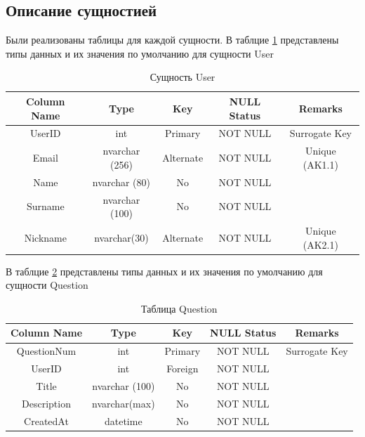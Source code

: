 \documentclass[a4paper, 14pt]{extarticle}
\begin{document}
\subsection{Описание сущностией}

Были реализованы таблицы для каждой сущности. В таблцие \ref{tab:user_tab} представлены типы данных и их значения по умолчанию для сущности User

\begin{table}[H]
\centering
\caption{Сущность User}
\label{tab:user_tab}
\setlength\extrarowheight{2pt}
\begin{tabular}{|c|c|c|c|c|}
\hline
\textbf{Column Name} & \textbf{Type} & \textbf{Key} & \textbf{NULL Status} & \textbf{Remarks} \\
\hline
UserID & int & Primary & NOT NULL & Surrogate Key \\
\hline
Email & nvarchar (256) & Alternate & NOT NULL & Unique (AK1.1) \\
\hline
Name & nvarchar (80) & No & NOT NULL & \\
\hline
Surname & nvarchar (100) & No & NOT NULL & \\
\hline
Nickname & nvarchar(30) & Alternate & NOT NULL & Unique (AK2.1) \\
\hline
\end{tabular}
\end{table}


В таблцие \ref{tab:question_tab} представлены типы данных и их значения по умолчанию для сущности Question

\begin{table}[H]
\centering
\caption{Таблица Question}
\label{tab:question_tab}
\setlength\extrarowheight{2pt}
\begin{tabular}{|c|c|c|c|c|}
\hline
\textbf{Column Name} & \textbf{Type} & \textbf{Key} & \textbf{NULL Status} & \textbf{Remarks} \\
\hline
QuestionNum & int & Primary & NOT NULL & Surrogate Key \\
\hline
UserID & int & Foreign & NOT NULL & \\
\hline
Title & nvarchar (100) & No & NOT NULL & \\
\hline
Description & nvarchar(max) & No & NOT NULL & \\
\hline
CreatedAt & datetime & No & NOT NULL & \\
\hline
\end{tabular}
\end{table}

\newpage
\end{document}
